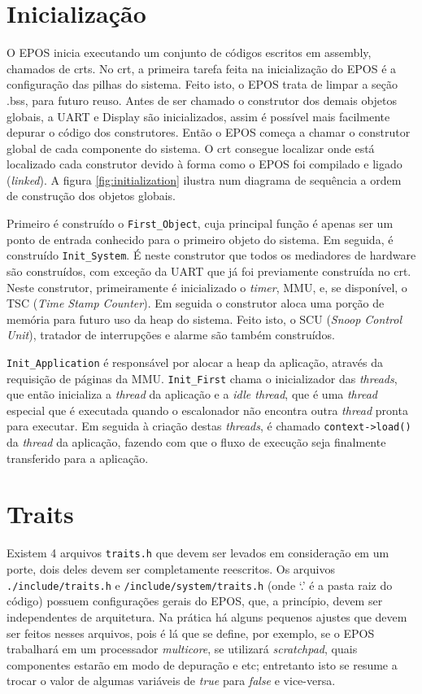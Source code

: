 \section{Inicialização}
\label{sec:inicializacao}
O EPOS inicia executando um conjunto de códigos escritos em assembly, chamados de crts.
No crt, a primeira tarefa feita na inicialização do EPOS é a configuração das pilhas do sistema. Feito isto, o EPOS trata de limpar a seção .bss, para futuro reuso.
Antes de ser chamado o construtor dos demais objetos globais, a UART e Display são inicializados, assim é possível mais facilmente depurar o código dos construtores.
Então o EPOS começa a chamar o construtor global de cada componente do sistema. O crt consegue localizar onde está localizado cada construtor devido à forma como o EPOS foi compilado e ligado (\emph{linked}). A figura \ref{fig:initialization} ilustra num diagrama de sequência a ordem de construção dos objetos globais.


Primeiro é construído o \verb+First_Object+, cuja principal função é apenas ser um ponto de entrada conhecido para o primeiro objeto do sistema.
Em seguida, é construído \verb+Init_System+. É neste construtor que todos os mediadores de hardware são construídos, com exceção da UART que já foi previamente construída no crt. Neste construtor, primeiramente é inicializado o \emph{timer}, MMU, e, se disponível, o TSC (\emph{Time Stamp Counter}). Em seguida o construtor aloca uma porção de memória para futuro uso da heap do sistema. Feito isto, o SCU (\emph{Snoop Control Unit}), tratador de interrupções e alarme são também construídos.

\verb+Init_Application+ é responsável por alocar a heap da aplicação, através da requisição de páginas da MMU. \verb+Init_First+ chama o inicializador das \emph{threads}, que então inicializa a \emph{thread} da aplicação e a \emph{idle thread}, que é uma \emph{thread} especial que é executada quando o escalonador não encontra outra \emph{thread} pronta para executar. Em seguida à criação destas \emph{threads}, é chamado \verb+context->load()+ da \emph{thread} da aplicação, fazendo com que o fluxo de execução seja finalmente transferido para a aplicação.

\section{Traits}
\label{sec:traits}
Existem 4 arquivos \verb=traits.h= que devem ser levados em consideração em um porte, dois deles devem ser completamente reescritos. Os arquivos \verb+./include/traits.h+ e \verb+/include/system/traits.h+ (onde `.' é a pasta raiz do código) possuem configurações gerais do EPOS, que, a princípio, devem ser independentes de arquitetura. Na prática há alguns pequenos ajustes que devem ser feitos nesses arquivos, pois é lá que se define, por exemplo, se o EPOS trabalhará em um processador \emph{multicore}, se utilizará \emph{scratchpad}, quais componentes estarão em modo de depuração e etc; entretanto isto se resume a trocar o valor de algumas variáveis de \emph{true} para \emph{false} e vice-versa.

